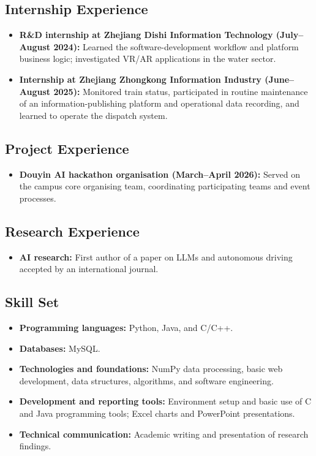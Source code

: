 \documentclass[a4paper,12pt]{article}
\begin{document}
\subsection*{Internship Experience}
\begin{itemize}
  \item \textbf{R\&D internship at Zhejiang Dishi Information Technology (July--August 2024):} Learned the software-development workflow and platform business logic; investigated VR/AR applications in the water sector.
  \item \textbf{Internship at Zhejiang Zhongkong Information Industry (June--August 2025):} Monitored train status, participated in routine maintenance of an information-publishing platform and operational data recording, and learned to operate the dispatch system.
\end{itemize}

\subsection*{Project Experience}
\begin{itemize}
  \item \textbf{Douyin AI hackathon organisation (March--April 2026):} Served on the campus core organising team, coordinating participating teams and event processes.
\end{itemize}

\subsection*{Research Experience}
\begin{itemize}
  \item \textbf{AI research:} First author of a paper on LLMs and autonomous driving accepted by an international journal.
\end{itemize}

\subsection*{Skill Set}
\begin{itemize}
  \item \textbf{Programming languages:} Python, Java, and C/C++.
  \item \textbf{Databases:} MySQL.
  \item \textbf{Technologies and foundations:} NumPy data processing, basic web development, data structures, algorithms, and software engineering.
  \item \textbf{Development and reporting tools:} Environment setup and basic use of C and Java programming tools; Excel charts and PowerPoint presentations.
  \item \textbf{Technical communication:} Academic writing and presentation of research findings.
\end{itemize}
\end{document}
